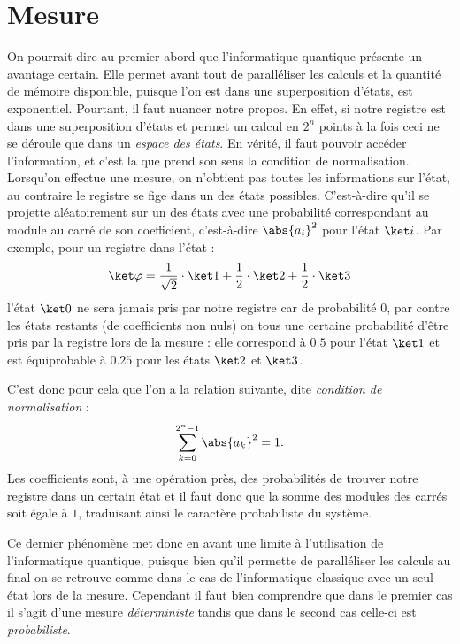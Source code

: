 \documentclass[a4paper,11pt]{tipe}
\begin{document}
\section{Mesure}
On pourrait dire au premier abord que l'informatique quantique présente un
avantage certain. Elle permet avant tout de paralléliser les calculs et la
quantité de mémoire disponible, puisque l'on est dans une superposition
d'états, est exponentiel. Pourtant, il faut nuancer notre propos. En effet, si
notre registre est dans une superposition d'états et permet un calcul en $2^n$
points à la fois ceci ne se déroule que dans un \emph{espace des états}. En
vérité, il faut pouvoir accéder l'information, et c'est la que prend son sens
la condition de normalisation. Lorsqu'on effectue une mesure, on n'obtient pas
toutes les informations sur l'état, au contraire le registre se \og fige \fg{}
dans un des états possibles. C'est-à-dire qu'il se projette aléatoirement sur
un des états avec une probabilité correspondant au module au carré de son
coefficient, c'est-à-dire $\abs{a_i} ^ 2$ pour l'état $\ket i$. Par exemple,
pour un registre dans l'état :
\[ \ket\varphi = \frac 1 {\sqrt 2} \cdot \ket 1
  + \frac 1 2 \cdot \ket 2
  + \frac 1 2 \cdot \ket 3
\]
l'état $\ket 0$ ne sera jamais pris par notre registre car de probabilité $0$,
par contre les états restants (de coefficients non nuls) on tous une certaine
probabilité d'être pris par la registre lors de la mesure : elle correspond à
$0.5$ pour l'état $\ket 1$ et est équiprobable à $0.25$ pour les états $\ket 2$
et $\ket 3$.

C'est donc pour cela que l'on a la relation suivante, dite \emph{condition de
normalisation} :
\[ \sum_{k=0}^{2^n-1} \abs{a_k} ^2 = 1.\]
Les coefficients sont, à une opération près, des probabilités de trouver notre
registre dans un certain état et il faut donc que la somme des modules des
carrés soit égale à $1$, traduisant ainsi le caractère probabiliste du système.

Ce dernier phénomène met donc en avant une limite à l'utilisation de
l'informatique quantique, puisque bien qu'il permette de paralléliser les
calculs au final on se retrouve comme dans le cas de l'informatique classique
avec un seul état lors de la mesure. Cependant il faut bien comprendre que dans
le premier cas il s'agit d'une mesure \emph{déterministe} tandis que dans le
second cas celle-ci est \emph{probabiliste}.
\end{document}
